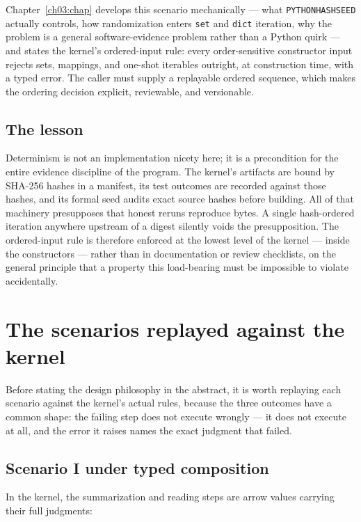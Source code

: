 Chapter~\ref{ch03:chap} develops this scenario mechanically ---
what \texttt{PYTHONHASHSEED} actually controls, how randomization enters
\texttt{set} and \texttt{dict} iteration, why the problem is a general
software-evidence problem rather than a Python quirk --- and states the
kernel's ordered-input rule: every order-sensitive constructor input rejects
sets, mappings, and one-shot iterables outright, at construction time, with a
typed error. The caller must supply a replayable ordered sequence, which
makes the ordering decision explicit, reviewable, and versionable.

\subsection{The lesson}

Determinism is not an implementation nicety here; it is a precondition for
the entire evidence discipline of the program. The kernel's artifacts are
bound by SHA-256 hashes in a manifest, its test outcomes are recorded against
those hashes, and its formal seed audits exact source hashes before building.
All of that machinery presupposes that honest reruns reproduce bytes. A
single hash-ordered iteration anywhere upstream of a digest silently voids
the presupposition. The ordered-input rule is therefore enforced at the
lowest level of the kernel --- inside the constructors --- rather than in
documentation or review checklists, on the general principle that a property
this load-bearing must be impossible to violate accidentally.

\section{The scenarios replayed against the kernel}\label{ch01:sec:replay}

Before stating the design philosophy in the abstract, it is worth
replaying each scenario against the kernel's actual rules, because the
three outcomes have a common shape: the failing step does not execute
wrongly --- it does not execute at all, and the error it raises names the
exact judgment that failed.

\subsection{Scenario I under typed composition}

In the kernel, the summarization and reading steps are arrow values
carrying their full judgments:

